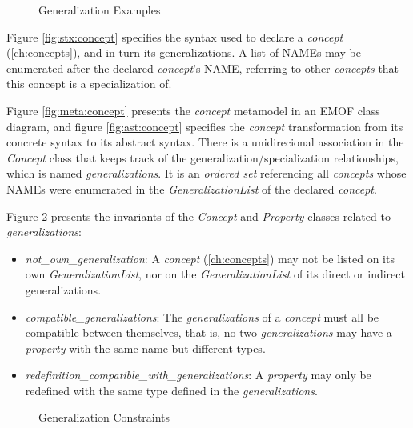 \begin{figure}
\verbatimfont{\small}

\caption{Generalization Examples}
\label{fig:ex:generalization}
\end{figure}

\begin{concrete-syntax}
Figure \ref{fig:stx:concept} specifies the syntax used
to declare a \emph{concept} (\ref{ch:concepts}),
and in turn its generalizations.
A list of NAMEs may be enumerated after the declared \emph{concept}'s NAME,
referring to other \emph{concepts} that this concept is a specialization of.
\end{concrete-syntax}

\begin{abstract-syntax}
Figure \ref{fig:meta:concept} presents the \emph{concept} metamodel
in an EMOF \cite{mof} class diagram,
and figure \ref{fig:ast:concept} specifies
the \emph{concept} transformation
from its concrete syntax to its abstract syntax.
There is a unidirecional association in the \emph{Concept} class
that keeps track of the generalization/specialization relationships,
which is named \emph{generalizations}.
It is an \emph{ordered set} referencing all \emph{concepts}
whose NAMEs were enumerated in the \emph{GeneralizationList}
of the declared \emph{concept}.
\end{abstract-syntax}

\begin{constraints}
Figure \ref{fig:ocl:generalization} presents the invariants
of the \emph{Concept} and \emph{Property} classes
related to \emph{generalizations}:

\begin{itemize}

\item \emph{not\_own\_generalization}:
A \emph{concept} (\ref{ch:concepts}) may not be listed on its own \emph{GeneralizationList},
nor on the \emph{GeneralizationList} of its direct or indirect generalizations.

\item \emph{compatible\_generalizations}:
The \emph{generalizations} of a \emph{concept} must all be compatible between themselves,
that is, no two \emph{generalizations} may have a \emph{property} with the same name
but different types.

\item \emph{redefinition\_compatible\_with\_generalizations}:
A \emph{property} may only be redefined with the same type defined in the \emph{generalizations}.

\end{itemize}
\end{constraints}

\begin{figure}

\caption{Generalization Constraints}
\label{fig:ocl:generalization}
\end{figure}
